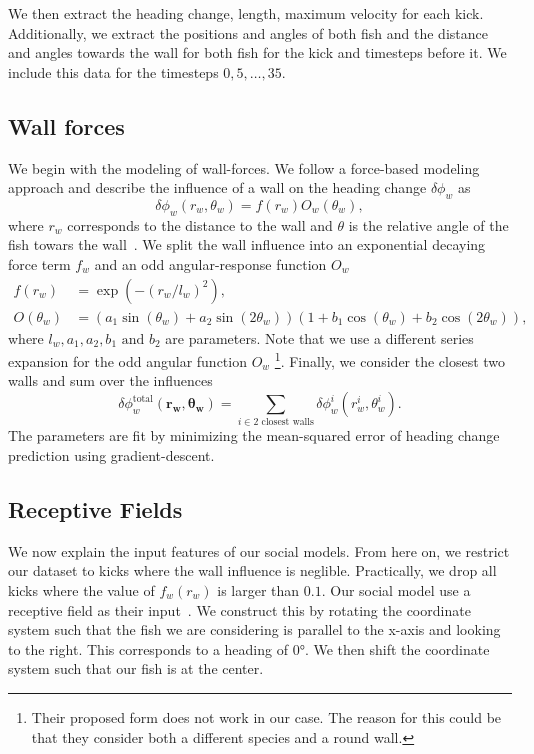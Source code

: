 \documentclass[nobib]{tufte-handout}
\begin{document}
We then extract the heading change, length, maximum velocity for each kick.
Additionally, we extract the positions and angles of both fish and the distance and angles towards the wall for both fish for the kick and timesteps before it.
We include this data for the timesteps \(0, 5, \ldots, 35 \).

\subsection{Wall forces}
We begin with the modeling of wall-forces.
We follow a force-based modeling approach and describe the influence of a wall on the heading change \(\delta \phi_w\) as
\begin{equation*}
  \delta \phi_w (r_w, \theta_w) = f(r_w)O_w(\theta_w),
\end{equation*}
where $r_w$ corresponds to the distance to the wall and $\theta$ is the relative angle of the fish towars the wall~\autocite{calovi}.
We split the wall influence into an exponential decaying force term \(f_w\) and an odd angular-response function \(O_w\)
\begin{align*}
  f(r_w) &= \exp \left( -{(r_w/l_w)}^2 \right), \\
  O(\theta_w) &= \left(a_1 \sin(\theta_w) + a_2 \sin(2  \theta_w)  \right)  \left(1 +  b_1  \cos(\theta_w) + b_2 \cos(2  \theta_w) \right),
\end{align*}
where $l_w, a_1, a_2, b_1 \text{ and } b_2$ are parameters.
Note that we use a different series expansion for the odd angular function \(O_w\)%
\footnote{Their proposed form does not work in our case.
  The reason for this could be that they consider both a different species and a round wall.}.
Finally, we consider the closest two walls and sum over the influences
\begin{equation*}
 \delta \phi_w^{\text{total}} \left( \bm{r_w}, \bm{\theta_w} \right) = \sum_{i \in 2 \text{ closest walls}} \delta \phi_w^i (r_w^i, \theta_w^i).
\end{equation*}
The parameters are fit by minimizing the mean-squared error of heading change prediction using gradient-descent.

\subsection{Receptive Fields}
We now explain the input features of our social models.
From here on, we restrict our dataset to kicks where the wall influence is neglible.
Practically, we drop all kicks where the value of \(f_w(r_w)\) is larger than $0.1$.
Our social model use a receptive field as their input~\autocite{discreteModes}.
We construct this by rotating the coordinate system such that the fish we are considering is parallel to the x-axis and looking to the right.
This corresponds to a heading of \ang{0}.
We then shift the coordinate system such that our fish is at the center.
\end{document}
